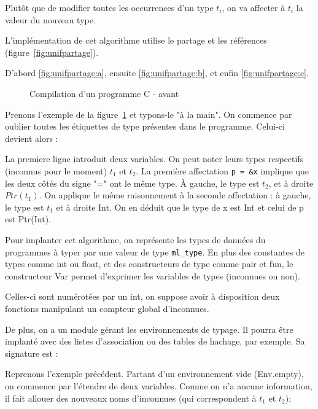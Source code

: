 Plutôt que de modifier toutes les occurrences d'un type $t_i$, on va affecter à
$t_i$ la valeur du nouveau type.

L'implémentation de cet algorithme utilise le partage et les références
(figure~\ref{fig:unifpartage}).

D'abord \ref{fig:unifpartage:a}, ensuite \ref{fig:unifpartage:b}, et enfin
\ref{fig:unifpartage:c}.

\begin{figure} %


  \caption{Compilation d'un programme C - avant}
  \label{fig:exunif:c}
\end{figure} %

Prenons l'exemple de la figure~\ref{fig:exunif:c} et typons-le "à la main". On
commence par oublier toutes les étiquettes de type présentes dans le programme.
Celui-ci devient alors :


La premiere ligne introduit deux variables. On peut noter leurs types respectifs
(inconnus pour le moment) $t_1$ et $t_2$. La première affectation \texttt{p =
\&x} implique que les deux côtés du signe "=" ont le même type. À gauche, le
type est $t_2$, et à droite $Ptr(t_1)$. On applique le même raisonnement à la
seconde affectation : à gauche, le type est $t_1$ et à droite Int. On en déduit
que le type de x est Int et celui de p est Ptr(Int).



Pour implanter cet algorithme, on représente les types de données du programmes
à typer par une valeur de type \texttt{ml\_type}. En plus des constantes de
types comme int ou float, et des constructeurs de type comme pair et fun, le
constructeur Var permet d'exprimer les variables de types (inconnues ou non).

Celles-ci sont numérotées par un int, on suppose avoir à disposition deux
fonctions manipulant un compteur global d'inconnues.


De plus, on a un module gérant les environnements de typage. Il pourra être
implanté avec des listes d'association ou des tables de hachage, par exemple. Sa
signature est :


Reprenons l'exemple précédent. Partant d'un environnement vide (Env.empty), on
commence par l'étendre de deux variables. Comme on n'a aucune information, il
fait allouer des nouveaux noms d'inconnues (qui correspondent à $t_1$ et $t_2$):


